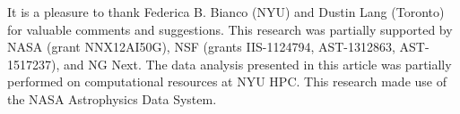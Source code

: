 \documentclass[12pt, preprint]{aastex}
\begin{document}
\acknowledgements
It is a pleasure to thank
  Federica B. Bianco (NYU)
  and
  Dustin Lang (Toronto)
for valuable comments and suggestions.
This research was partially supported by
  NASA (grant NNX12AI50G),
  NSF (grants IIS-1124794, AST-1312863, AST-1517237),
  and NG Next.
The data analysis presented in this article was partially performed on computational resources at NYU HPC.
This research made use of the NASA Astrophysics Data System.


\clearpage

\clearpage
\end{document}
